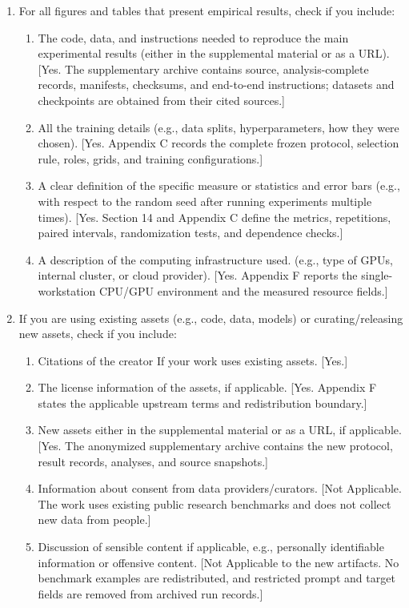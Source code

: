\begin{enumerate}
  \item For all figures and tables that present empirical results, check if you
  include:
  \begin{enumerate}
    \item The code, data, and instructions needed to reproduce the main
    experimental results (either in the supplemental material or as a URL).
    [Yes. The supplementary archive contains source, analysis-complete records,
    manifests, checksums, and end-to-end instructions; datasets and checkpoints
    are obtained from their cited sources.]
    \item All the training details (e.g., data splits, hyperparameters, how they
    were chosen). [Yes. Appendix C records the complete frozen protocol,
    selection rule, roles, grids, and training configurations.]
    \item A clear definition of the specific measure or statistics and error
    bars (e.g., with respect to the random seed after running experiments
    multiple times). [Yes. Section 14 and Appendix C define the metrics,
    repetitions, paired intervals, randomization tests, and dependence checks.]
    \item A description of the computing infrastructure used. (e.g., type of
    GPUs, internal cluster, or cloud provider). [Yes. Appendix F reports the
    single-workstation CPU/GPU environment and the measured resource fields.]
  \end{enumerate}

  \item If you are using existing assets (e.g., code, data, models) or
  curating/releasing new assets, check if you include:
  \begin{enumerate}
    \item Citations of the creator If your work uses existing assets. [Yes.]
    \item The license information of the assets, if applicable. [Yes. Appendix
    F states the applicable upstream terms and redistribution boundary.]
    \item New assets either in the supplemental material or as a URL, if
    applicable. [Yes. The anonymized supplementary archive contains the new
    protocol, result records, analyses, and source snapshots.]
    \item Information about consent from data providers/curators. [Not
    Applicable. The work uses existing public research benchmarks and does not
    collect new data from people.]
    \item Discussion of sensible content if applicable, e.g., personally
    identifiable information or offensive content. [Not Applicable to the new
    artifacts. No benchmark examples are redistributed, and restricted prompt
    and target fields are removed from archived run records.]
  \end{enumerate}


\end{enumerate}
